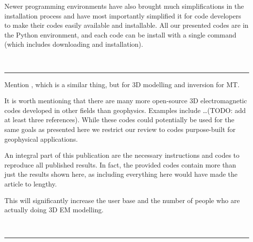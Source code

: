 \documentclass[
    paper,
  ]{geophysics}
\begin{document}
Newer programming environments  have also
brought much simplifications in the installation process and have most
importantly simplified it for code developers to make their codes easily
available and installable. All our presented codes are in the Python
environment, and each code can be install with a single command (which includes
downloading and installation).


~\\ \hrule


Mention \cite{GJI.13.Miensopust}, which is a similar thing, but for 3D
modelling and inversion for MT.


It is worth mentioning that there are many more open-source 3D electromagnetic
codes developed in other fields than geophysics. Examples include \dots (TODO:
add at least three references). While these codes could potentially be used for
the same goals as presented here we restrict our review to codes purpose-built
for geophysical applications.

An integral part of this publication are the necessary instructions and codes
to reproduce all published results. In fact, the provided codes contain more
than just the results shown here, as including everything here would have made
the article to lengthy.

This will significantly increase the user base and the number of people who are
actually doing 3D EM modelling.

~\\ \hrule
\end{document}
